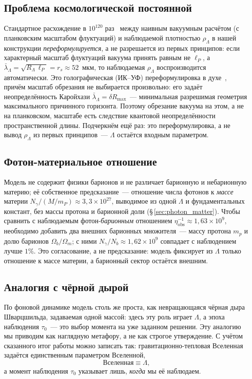 \documentclass[12pt,a4paper]{article}
\begin{document}
\subsection{Проблема космологической постоянной}

Стандартное расхождение в $10^{120}$ раз~\cite{Weinberg1989} между наивным вакуумным расчётом (с планковским масштабом флуктуаций) и наблюдаемой плотностью $\rho_\Lambda$ в нашей конструкции \emph{переформулируется}, а не разрешается из первых принципов: если характерный масштаб флуктуаций вакуума принять равным не $\ell_P$, а $\bar\lambda_\Lambda = \sqrt{R_\Lambda\,\ell_P} = r_s \approx 52$~мкм, то наблюдаемая $\rho_\Lambda$ воспроизводится автоматически. Это голографическая (ИК--УФ) переформулировка в духе~\cite{Cohen1999,Li2004,Padmanabhan2005,WangWangLi2017}, причём масштаб обрезания не выбирается произвольно: его задаёт неопределённость Каройхази $\bar\lambda_\Lambda = \delta R_{\max}$~--- минимальная разрешимая геометрия максимального причинного горизонта. Поэтому обрезание вакуума на этом, а не на планковском, масштабе есть следствие квантовой неопределённости пространственной длины. Подчеркнём ещё раз: это переформулировка, а не вывод $\rho_\Lambda$ из первых принципов~--- $\Lambda$ остаётся входным параметром.

\subsection{Фотон-материальное отношение}

Модель не содержит физики барионов и не различает барионную и небарионную материю; её собственное предсказание~--- отношение числа фотонов к \emph{массе} материи $N_\gamma/(M/m_P) \approx 3{,}3\times10^{27}$, выводимое из одной $\Lambda$ и фундаментальных констант, без массы протона и барионной доли (\S\,\ref{sec:photon_matter}). Чтобы сравнить с наблюдаемым фотон-\emph{барионным} отношением $\eta_{\mathrm{obs}}^{-1}\approx1{,}63\times10^9$, необходимо добавить два внешних барионных множителя~--- массу протона $m_p$ и долю барионов $\Omega_b/\Omega_m$; с ними $N_\gamma/N_b\approx1{,}62\times10^9$ совпадает с наблюдением лучше $1\%$. Это согласование, а не предсказание: модель фиксирует из $\Lambda$ только отношение к массе материи, а барионный сектор остаётся внешним.

\subsection{Аналогия с чёрной дырой}

По фоновой динамике модель столь же проста, как невращающаяся чёрная дыра Шварцшильда, задаваемая одной массой: здесь эту роль играет $\Lambda$, а эпоха наблюдения $\tau_0$~--- это выбор момента на уже заданном решении. Эту аналогию мы приводим как наглядную метафору, а не как строгое утверждение. С учётом сказанного итог работы можно записать так: гравитационно-тепловая Вселенная задаётся единственным параметром Вселенной,
\begin{equation}
\boxed{\text{Вселенная} \equiv \Lambda,}
\end{equation}
а момент наблюдения $\tau_0$ указывает лишь, \emph{когда} мы её наблюдаем.




\end{document}
